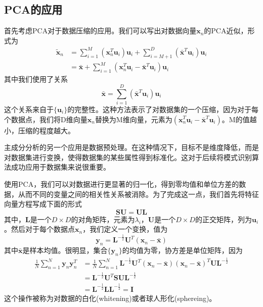 \subsection*{PCA的应用}
首先考虑PCA对于数据压缩的应用。我们可以写出对数据向量$\boldsymbol{x}_n$的PCA近似，形式为
\begin{equation}
\begin{aligned}
	\tilde{\boldsymbol{x}}_n&=\sum_{i=1}^{M}(\boldsymbol{x}_n^T\boldsymbol{u}_i)\boldsymbol{u}_i+\sum_{i=M+1}^{D}(\bar{\boldsymbol{x}}^T\boldsymbol{u}_i)\boldsymbol{u}_i\\
	&=\bar{\boldsymbol{x}}+\sum_{i=1}^{M}(\boldsymbol{x}_n^T\boldsymbol{u}_i-\bar{\boldsymbol{x}}^T\boldsymbol{u}_i)\boldsymbol{u}_i
\end{aligned}
\end{equation}
其中我们使用了关系
\begin{equation}
	\bar{\boldsymbol{x}}=\sum_{i=1}^{D}(\bar{\boldsymbol{x}}^T\boldsymbol{u}_i)\boldsymbol{u}_i
\end{equation}
这个关系来自于$\{\boldsymbol{u}_i\}$的完整性。这种方法表示了对数据集的一个压缩，因为对于每个数据点，我们将D维向量$\boldsymbol{x}_n$替换为M维向量，元素为$(\boldsymbol{x}_n^T\boldsymbol{u}_i-\bar{\boldsymbol{x}}^T\boldsymbol{u}_i)$。M的值越小，压缩的程度越大。

主成分分析的另一个应用是数据预处理。在这种情况下，目标不是维度降低，而是对数据集进行变换，使得数据集的某些属性得到标准化。这对于后续将模式识别算法成功应用于数据集来说很重要。

使用PCA，我们可以对数据进行更显著的归一化，得到零均值和单位方差的数据，从而不同的变量之间的相关性关系被消除。为了完成这一点，我们首先将特征向量方程写成下面的形式
\begin{equation}
	\boldsymbol{SU}=\boldsymbol{UL}
\end{equation}
其中，$\boldsymbol{L}$是一个$D\times D$的对角矩阵，元素为$\lambda_i$，$\boldsymbol{U}$是一个$D\times D$的正交矩阵，列为$\boldsymbol{u}_i$。然后对于每个数据点$\boldsymbol{x}_n$，我们定义一个变换，值为
\begin{equation}
	\boldsymbol{y}_n=\boldsymbol{L}^{-\frac{1}{2}}\boldsymbol{U}^T(\boldsymbol{x}_n-\bar{\boldsymbol{x}})
\end{equation}
其中$\bar{\boldsymbol{x}}$是样本均值。很明显，集合$\{\boldsymbol{y}_n\}$的均值为零，协方差是单位矩阵，因为
\begin{equation}
	\begin{aligned}
		\frac{1}{N}\sum_{n=1}^{N}\boldsymbol{y}_n\boldsymbol{y}_n^T&=\frac{1}{N}\sum_{n=1}^{N}\boldsymbol{L}^{-\frac{1}{2}}\boldsymbol{U}^T(\boldsymbol{x}_n-\bar{\boldsymbol{x}})(\boldsymbol{x}_n-\bar{\boldsymbol{x}})^T\boldsymbol{UL}^{-\frac{1}{2}}\\
		&=\boldsymbol{L}^{-\frac{1}{2}}\boldsymbol{U}^T\boldsymbol{SUL}^{-\frac{1}{2}}\\
		&=\boldsymbol{L}^{-\frac{1}{2}}\boldsymbol{LL}^{-\frac{1}{2}}=\boldsymbol{I}
	\end{aligned}
\end{equation}
这个操作被称为对数据的白化(whitening)或者球人形化(sphereing)。

